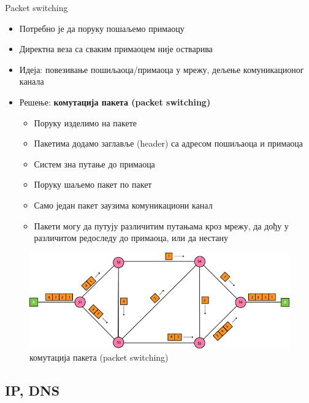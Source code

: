 \documentclass{beamer}
\begin{document}
    \begin{frame}[allowframebreaks]{Packet switching}
        \begin{itemize}
            \item Потребно је да поруку пошаљемо примаоцу
            \item Директна веза са сваким примаоцем није остварива
            \item Идеја: повезивање пошиљаоца/примаоца у мрежу, дељење комуникационог канала
            \item Решење: \textbf{комутација пакета (packet switching)}
            \begin{itemize}
                \item Поруку изделимо на пакете
                \item Пакетима додамо заглавље (header) са адресом пошиљаоца и примаоца
                \item Систем зна путање до примаоца
                \item Поруку шаљемо пакет по пакет
                \item Само један пакет заузима комуникациони канал
                \item Пакети могу да путују различитим путањама кроз мрежу, да дођу у различитом редоследу до примаоца, или да нестану
            \end{itemize}
        \end{itemize}

        \framebreak

        \begin{figure}
            \centering
            \includegraphics[width=\textwidth,height=\textheight,keepaspectratio]{images/pcsw.png}
            \caption{комутација пакета (packet switching)}
            \label{fig:pcsw}
        \end{figure}
    \end{frame}

    \subsection{IP, DNS}
\end{document}
